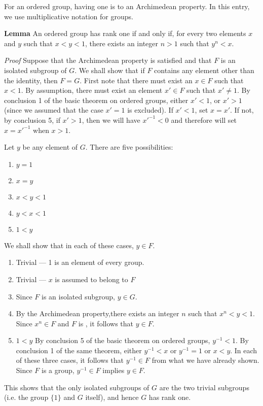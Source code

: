 \documentclass[12pt]{article}
\begin{document}
For an ordered group, having  one is  to an Archimedean property.  In this entry, we use multiplicative notation for groups.

\textbf{Lemma} An ordered group has rank one if and only if, for every two elements $x$ and $y$ such that $x < y < 1$, there exists an integer $n > 1$ such that $y^n < x$.

{\it Proof}  Suppose that the Archimedean property is satisfied and that $F$ is an isolated subgroup of $G$.  We shall show that if $F$ contains any element other than the identity, then $F = G$.  First note that there must exist an $x \in F$ such that $x < 1$.  By assumption, there must exist an element $x' \in F$ such that $x' \neq 1$.  By conclusion 1 of the basic theorem on ordered groups, either $x' < 1$, or $x' > 1$ (since we assumed that the case $x' = 1$ is excluded).  If $x' < 1$, set $x = x'$.  If not, by conclusion 5, if $x' > 1$, then we will have $x'^{-1} < 0$ and therefore will set $x = x'^{-1}$ when $x > 1$.

Let $y$ be any element of $G$.  There are five possibilities:
\begin{enumerate}
\item $y = 1$
\item $x = y$
\item $x < y < 1$
\item $y < x < 1$
\item $1 < y$
\end{enumerate}
We shall show that in each of these cases, $y \in F$.  
\begin{enumerate}
\item Trivial --- 1 is an element of every group.
\item Trivial --- $x$ is assumed to belong to $F$
\item Since $F$ is an isolated subgroup, $y \in G$.
\item By the Archimedean property,there exists an integer $n$ such that $x^n < y < 1$.  Since $x^n \in F$ and $F$ is , it follows that $y \in F$.
\item $1 < y$ By conclusion 5 of the basic theorem on ordered groups, $y^{-1} < 1$.  By conclusion 1 of the same theorem, either $y^{-1} < x$ or $y^{-1} = 1$ or $x < y$.  In each of these three cases, it follows that $y^{-1} \in F$ from what we have already shown.  Since $F$ is a group, $y^{-1} \in F$ implies $y \in F$.
\end{enumerate}
This shows that the only isolated subgroups of $G$ are the two trivial subgroups (i.e. the group $\{1\}$ and $G$ itself), and hence $G$ has rank one.
\end{document}
